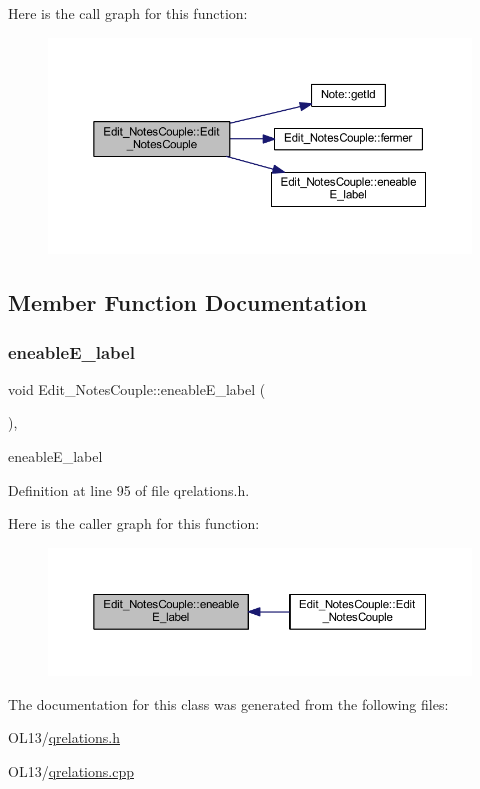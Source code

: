 Here is the call graph for this function\+:\nopagebreak
\begin{figure}[H]
\begin{center}
\leavevmode
\includegraphics[width=350pt]{class_edit___notes_couple_aa0780f3a53175747c5a7136d4f2ffa30_cgraph}
\end{center}
\end{figure}


\subsection{Member Function Documentation}
\mbox{\label{class_edit___notes_couple_ad51b47f9284bea44cddc186674c57bc9}} 
\subsubsection{\texorpdfstring{eneable\+E\+\_\+label}{eneableE\_label}}
{\footnotesize\ttfamily void Edit\+\_\+\+Notes\+Couple\+::eneable\+E\+\_\+label (\begin{DoxyParamCaption}{ }\end{DoxyParamCaption})\hspace{0.3cm}{\ttfamily [inline]}, {\ttfamily [slot]}}

eneable\+E\+\_\+label 

Definition at line 95 of file qrelations.\+h.

Here is the caller graph for this function\+:\nopagebreak
\begin{figure}[H]
\begin{center}
\leavevmode
\includegraphics[width=350pt]{class_edit___notes_couple_ad51b47f9284bea44cddc186674c57bc9_icgraph}
\end{center}
\end{figure}


The documentation for this class was generated from the following files\+:\begin{DoxyCompactItemize}
\item 
O\+L13/\hyperlink{qrelations_8h}{qrelations.\+h}\item 
O\+L13/\hyperlink{qrelations_8cpp}{qrelations.\+cpp}\end{DoxyCompactItemize}
